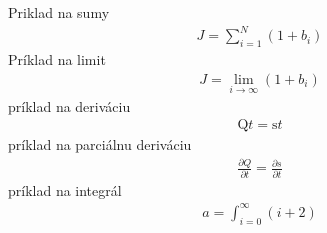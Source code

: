 \documentclass{book}
\begin{document}
Priklad na sumy
\begin{eqnarray}
J=\sum_{i=1}^N (1+b_i)
\end{eqnarray}
Príklad na limit
\begin{eqnarray}
J=\lim_{i\rightarrow\infty} (1+b_i)
\end{eqnarray}
príklad na deriváciu
\begin{eqnarray}
\mathrm{Q}{t} = \mathrm{s}{t}
\end{eqnarray}
príklad na parciálnu deriváciu
\begin{eqnarray}
\frac{\partial Q}{\partial t} = \frac{\partial s}{\partial t}
\end{eqnarray}
príklad na integrál
\begin{eqnarray}
a=\int_{i=0}^\infty (i+2)
\end{eqnarray}
\end{document}

